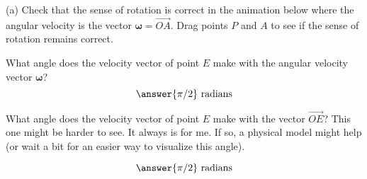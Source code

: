 \documentclass{ximera}
\begin{document}
\begin{exploration}  \label{Ex4gb3e3:Cross}

(a) Check that the sense of rotation is correct in the animation below where the angular velocity is the vector $\boldsymbol{\omega} = \overrightarrow{OA}$. Drag points $P$ and $A$ to see if the sense of rotation remains correct.


 
\begin{onlineOnly}
    \begin{center}
\end{center}
\end{onlineOnly}

\begin{question} \label{Qdsbhjj}
What angle does the velocity vector of point $E$ make with the angular velocity vector $\boldsymbol{\omega}$? 
\[
   \answer{\pi/2} \text{ radians}
\]
\end{question}


\begin{question} \label{Qddsghhhjj}
What angle does the velocity vector of point $E$ make with the vector ${\overrightarrow{OE}}$? This one might be harder to see. It always is for me. If so, a physical model might help (or wait a bit for an easier way to visualize this angle).

\[
   \answer{\pi/2} \text{ radians}
\]
\end{question}




\end{exploration}
\end{document}
